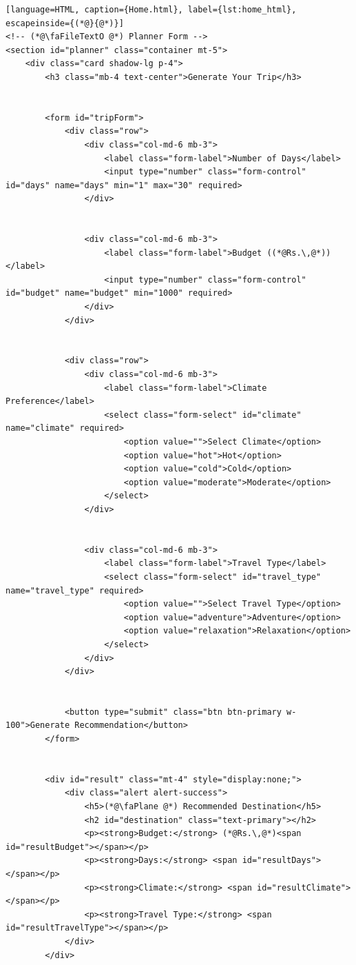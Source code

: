 \begin{lstlisting}[language=HTML, caption={Home.html}, label={lst:home_html}, escapeinside={(*@}{@*)}]
<!-- (*@\faFileTextO @*) Planner Form -->
<section id="planner" class="container mt-5">
    <div class="card shadow-lg p-4">
        <h3 class="mb-4 text-center">Generate Your Trip</h3>


        <form id="tripForm">
            <div class="row">
                <div class="col-md-6 mb-3">
                    <label class="form-label">Number of Days</label>
                    <input type="number" class="form-control" id="days" name="days" min="1" max="30" required>
                </div>


                <div class="col-md-6 mb-3">
                    <label class="form-label">Budget ((*@Rs.\,@*))</label>
                    <input type="number" class="form-control" id="budget" name="budget" min="1000" required>
                </div>
            </div>


            <div class="row">
                <div class="col-md-6 mb-3">
                    <label class="form-label">Climate Preference</label>
                    <select class="form-select" id="climate" name="climate" required>
                        <option value="">Select Climate</option>
                        <option value="hot">Hot</option>
                        <option value="cold">Cold</option>
                        <option value="moderate">Moderate</option>
                    </select>
                </div>


                <div class="col-md-6 mb-3">
                    <label class="form-label">Travel Type</label>
                    <select class="form-select" id="travel_type" name="travel_type" required>
                        <option value="">Select Travel Type</option>
                        <option value="adventure">Adventure</option>
                        <option value="relaxation">Relaxation</option>
                    </select>
                </div>
            </div>


            <button type="submit" class="btn btn-primary w-100">Generate Recommendation</button>
        </form>


        <div id="result" class="mt-4" style="display:none;">
            <div class="alert alert-success">
                <h5>(*@\faPlane @*) Recommended Destination</h5>
                <h2 id="destination" class="text-primary"></h2>
                <p><strong>Budget:</strong> (*@Rs.\,@*)<span id="resultBudget"></span></p>
                <p><strong>Days:</strong> <span id="resultDays"></span></p>
                <p><strong>Climate:</strong> <span id="resultClimate"></span></p>
                <p><strong>Travel Type:</strong> <span id="resultTravelType"></span></p>
            </div>
        </div>



\end{lstlisting}
